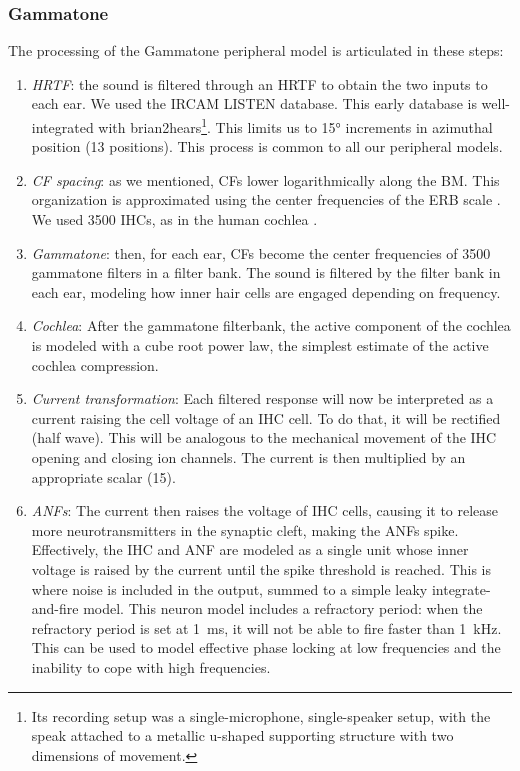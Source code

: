 \documentclass[11pt,a4paper]{article}
\begin{document}
\subsubsection{Gammatone}
The processing of the Gammatone peripheral model is articulated in these steps:
\begin{enumerate}
    \item \textit{HRTF}: the sound is filtered through an HRTF to obtain the two inputs to each ear. We used the IRCAM LISTEN \cite{LISTENHRTFDATABASE} database. This early database is well-integrated with brian2hears\footnote{Its recording setup was a single-microphone, single-speaker setup, with the speak attached to a metallic u-shaped supporting structure with two dimensions of movement.}. This limits us to \ang{15} increments in azimuthal position (13 positions). This process is common to all our peripheral models.
    \item \textit{CF spacing}: as we mentioned, CFs lower logarithmically along the BM. This organization is approximated using the center frequencies of the ERB scale \cite{zwickerAnalyticalExpressionsCriticalband1980a}. We used 3500 IHCs, as in the human cochlea \cite{ashmoreCochlearOuterHair2008}.
    \item \textit{Gammatone}: then, for each ear, CFs become the center frequencies of 3500 gammatone filters in a filter bank. The sound is filtered by the filter bank in each ear, modeling how inner hair cells are engaged depending on frequency.
    \item \textit{Cochlea}: After the gammatone filterbank, the active component of the cochlea is modeled with a cube root power law, the simplest estimate \cite{stevensPsychophysicalLaw1957} of the active cochlea compression.
    \item \textit{Current transformation}: Each filtered response will now be interpreted as a current raising the cell voltage of an IHC cell. To do that, it will be rectified (half wave). This will be analogous to the mechanical movement of the IHC opening and closing ion channels. The current is then multiplied by an appropriate scalar (15).
    \item \textit{ANFs}: The current then raises the voltage of IHC cells, causing it to release more neurotransmitters in the synaptic cleft, making the ANFs spike. Effectively, the IHC and ANF are modeled as a single unit whose inner voltage is raised by the current until the spike threshold is reached. This is where noise is included in the output, summed to a simple leaky integrate-and-fire model. This neuron model includes a refractory period: when the refractory period is set at \qty{1}{\milli\second}, it will not be able to fire faster than \qty{1}{\kilo\hertz}. This can be used to model effective phase locking at low frequencies and the inability to cope with high frequencies.
\end{enumerate}
\end{document}
